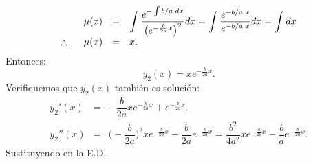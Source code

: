 \documentclass{beamer}
\begin{document}
\begin{frame}[t]
	\begin{block}{}
		\[
			\begin{array}{rcl}
				\mu (x)  & = & \displaystyle\int \dfrac{e^{-\int b/a\;dx}}{\big(e^{- \frac{b}{2a} x}\big) ^2} dx = \displaystyle\int \dfrac{e^{-b/a \;x}}{e^{-b/a\;x}} dx = \displaystyle\int dx \\[2mm]
				\therefore \hspace{5mm} \mu (x) & = & x.
			\end{array}
		\]
		Entonces:
		\[
			y_2(x) = xe^{- \frac{b}{2a} x}.
		\]
		Verifiquemos que \(y_2(x)\) también es solución:
		\[
			\begin{array}{rcl}
				y_2' (x) & = & - \dfrac{b}{2a} xe^{- \frac{b}{2a} x} + e^{- \frac{b}{2a} x}. \\[2mm]
				y_2''(x) & = & \bigg(- \dfrac{b}{2a}\bigg) ^2xe^{- \frac{b}{2a} x} - \dfrac{b}{2a} e^{- \frac{b}{2a} x} = \dfrac{b^2}{4a^2} xe^{- \frac{b}{2a} x} - \dfrac{b}{a} e^{- \frac{b}{2a} x}.
			\end{array}
		\]
		Sustituyendo en la E.D.
	\end{block}
\end{frame}
\end{document}
